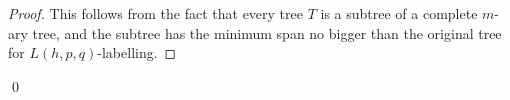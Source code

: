 \begin{proof}
This follows from the fact that every tree $T$ is a subtree of a complete $m$-ary tree, and the subtree has the minimum span no bigger than the original tree for $L(h,p,q)$-labelling. 
\end{proof}
\qed





